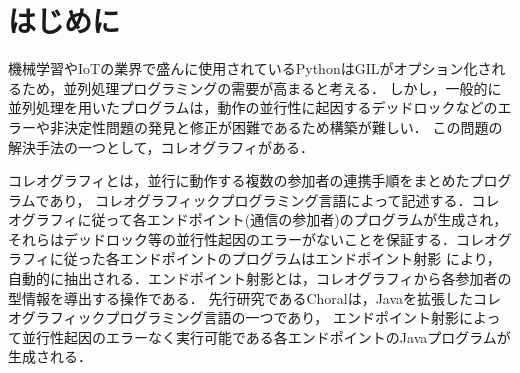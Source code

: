 \documentclass{thesis}
\begin{document}

\maketitle %
\frontmatter\tableofcontents\mainmatter %

\chapter{はじめに}
機械学習やIoTの業界で盛んに使用されているPythonはGILがオプション化されるため，並列処理プログラミングの需要が高まると考える．
しかし，一般的に並列処理を用いたプログラムは，動作の並行性に起因するデッドロックなどのエラーや非決定性問題の発見と修正が困難であるため構築が難しい．
この問題の解決手法の一つとして，コレオグラフィがある．

コレオグラフィとは，並行に動作する複数の参加者の連携手順をまとめたプログラムであり，
コレオグラフィックプログラミング言語によって記述する．コレオグラフィに従って各エンドポイント(通信の参加者)のプログラムが生成され，
それらはデッドロック等の並行性起因のエラーがないことを保証する．コレオグラフィに従った各エンドポイントのプログラムはエンドポイント射影
により，自動的に抽出される．エンドポイント射影とは，コレオグラフィから各参加者の型情報を導出する操作である．
先行研究であるChoralは，Javaを拡張したコレオグラフィックプログラミング言語の一つであり，
エンドポイント射影によって並行性起因のエラーなく実行可能である各エンドポイントのJavaプログラムが生成される．
\end{document}
